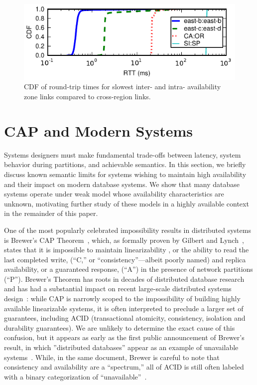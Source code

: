 \begin{figure}
\includegraphics[width=\columnwidth]{graphs/ping-plot.pdf}
\caption{CDF of round-trip times for slowest inter- and intra-
  availability zone links compared to cross-region links.}
\label{fig:rtt}
\end{figure}


\section{CAP and Modern Systems}
\label{sec:modernacid}

Systems designers must make fundamental trade-offs between latency,
system behavior during partitions, and achievable semantics. In this
section, we briefly discuss known semantic limits for systems wishing
to maintain high availability and their impact on modern database
systems. We show that many database systems operate under weak model
whose availability characteristics are unknown, motivating further
study of these models in a highly available context in the remainder
of this paper.

One of the most popularly celebrated impossibility results in
distributed systems is Brewer's CAP Theorem~\cite{brewer-slides},
which, as formally proven by Gilbert and Lynch~\cite{gilbert-cap},
states that it is impossible to maintain linearizability , or the
ability to read the last completed write, (``C,'' or
``consistency''---albeit poorly named) and replica availability, or a
guaranteed response, (``A'') in the presence of network partitions
(``P''). Brewer's Theorem has roots in decades of distributed database
research~\cite{davidson-survey} and has had a substantial impact on
recent large-scale distributed systems design~\cite{bigtable, pnuts,
  dynamo}: while CAP is narrowly scoped to the impossibility of
building highly available linearizable systems, it is often
interpreted to preclude a larger set of guarantees, including ACID
(transactional atomicity, consistency, isolation and durability
guarantees). We are unlikely to determine the exact cause of this
confusion, but it appears as early as the first public announcement of
Brewer's result, in which ''distributed databases'' appear as an
example of unavailable systems~\cite{brewer-slides}. While, in the
same document, Brewer is careful to note that consistency and
availability are a ``spectrum,'' all of ACID is still often labeled
with a binary categorization of ``unavailable''~\cite{hn,
  foundation-article}.


